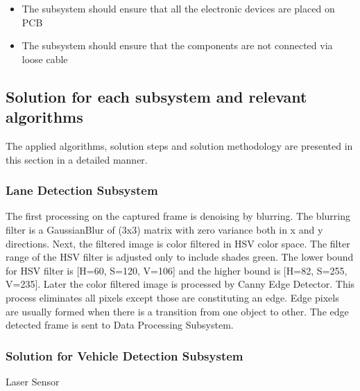 \documentclass[a4paper,12pt]{article}
\begin{document}
		\begin{itemize}
			\item The subsystem should ensure that all the electronic devices are placed on PCB
			\item The subsystem should ensure that the components are not connected via loose cable 	
		\end{itemize}	



	



	\subsection{Solution for each subsystem and relevant algorithms}

		The applied algorithms, solution steps and solution methodology are presented in this section in a detailed manner.
			\subsubsection{Lane Detection Subsystem}
				The first processing on the captured frame is denoising by blurring. The blurring filter is a GaussianBlur of (3x3) matrix with zero variance both in x and y directions. Next, the filtered image is color filtered in HSV color space. The filter range of the HSV filter is adjusted only to include shades green. The lower bound for HSV filter is [H=60, S=120, V=106] and the higher bound is [H=82, S=255, V=235]. Later the color filtered image is processed by Canny Edge Detector. This process eliminates all pixels except those are constituting an edge. Edge pixels are usually formed when there is a transition from one object to other. The edge detected frame is sent to Data Processing Subsystem.
				
			
		\subsubsection{Solution for Vehicle Detection Subsystem}
		
			Laser Sensor
	
	
\end{document}
